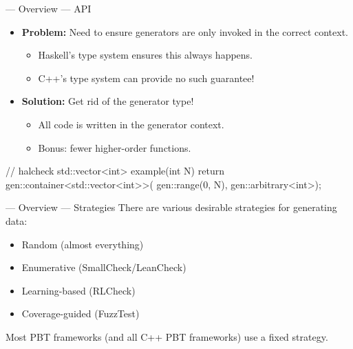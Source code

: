 \begin{frame}[fragile]{\halcheck{} --- Overview --- API}
  \begin{itemize}
    \item \textbf{Problem:} Need to ensure generators are only invoked in the correct context.
          \begin{itemize}
            \item Haskell's type system ensures this always happens.
            \item C++'s type system can provide no such guarantee!
          \end{itemize}
          \pause{}
    \item \textbf{Solution:} Get rid of the generator type!
          \begin{itemize}
            \item All code is written in the generator context.
            \item Bonus: fewer higher-order functions.
          \end{itemize}
  \end{itemize}

  \begin{cppcode}
    // halcheck
    std::vector<int> example(int N) {
      return gen::container<std::vector<int>>(
        gen::range(0, N),
        gen::arbitrary<int>);
    }
  \end{cppcode}
\end{frame}


\begin{frame}{\halcheck{} --- Overview --- Strategies}
  There are various desirable strategies for generating data:
  \begin{itemize}
    \item Random (almost everything)
    \item Enumerative (SmallCheck/LeanCheck) \pause{}
    \item Learning-based (RLCheck)
    \item Coverage-guided (FuzzTest) \pause{}
  \end{itemize}

  Most PBT frameworks (and all C++ PBT frameworks) use a \alert{fixed strategy}.
\end{frame}

